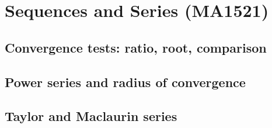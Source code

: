 
\section{Sequences and Series (MA1521)}

\subsection{Convergence tests: ratio, root, comparison}


\subsection{Power series and radius of convergence}


\subsection{Taylor and Maclaurin series}


